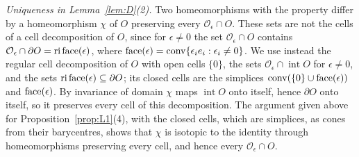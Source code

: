 \emph{Uniqueness in Lemma~\ref{lem:D}(2).} Two homeomorphisms with the property differ by a homeomorphism $\chi$
of $O$ preserving every $\mathcal O_\epsilon\cap O$. These sets are not the cells of a cell decomposition of $O$, since for
$\epsilon\ne0$ the set $\mathcal O_\epsilon\cap O$ contains $\mathcal O_\epsilon\cap\partial O=\operatorname{ri}\operatorname{face}(\epsilon)$, where
$\operatorname{face}(\epsilon)=\operatorname{conv}\{\epsilon_ie_i:\epsilon_i\ne0\}$. We use instead the regular cell decomposition of
$O$ with open cells $\{0\}$, the sets $\mathcal O_\epsilon\cap\operatorname{int}O$ for $\epsilon\ne0$, and the sets
$\operatorname{ri}\operatorname{face}(\epsilon)\subseteq\partial O$; its closed cells are the simplices
$\operatorname{conv}(\{0\}\cup\operatorname{face}(\epsilon))$ and $\operatorname{face}(\epsilon)$. By invariance of domain $\chi$ maps
$\operatorname{int}O$ onto itself, hence $\partial O$ onto itself, so it preserves every cell of this decomposition. The
argument given above for Proposition~\ref{prop:L1}(4), with the closed cells, which are simplices, as cones from their
barycentres, shows that $\chi$ is isotopic to the identity through homeomorphisms preserving every cell, and hence every
$\mathcal O_\epsilon\cap O$.
